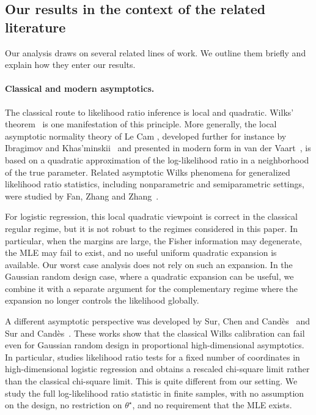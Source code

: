 \documentclass[11pt, letterpaper, hidelinks]{article}
\newcommand{\1}{\mathbf 1}
\theoremstyle{plain}
\theoremstyle{definition}
\newcommand{\thetastar}{\theta^\star}
\begin{document}
\subsection{Our results in the context of the related literature}

Our analysis draws on several related lines of work. We outline them briefly and
explain how they enter our results.

\paragraph{Classical and modern asymptotics.}

The classical route to likelihood ratio inference is local and quadratic.
Wilks' theorem~\cite{wilks1938large} is one manifestation of this principle.
More generally, the local asymptotic normality theory of Le Cam
\cite{LeCam1960LAN,LeCamYang2000}, developed further for instance by
Ibragimov and Khas'minskii~\cite{IbragimovKhasminskii1981} and presented in
modern form in van der Vaart~\cite{vdV1998asymptotic}, is based on a quadratic
approximation of the log-likelihood ratio in a neighborhood of the true
parameter. Related asymptotic Wilks phenomena for generalized likelihood ratio
statistics, including nonparametric and semiparametric settings, were studied
by Fan, Zhang and Zhang~\cite{FanZhangZhang2001Wilks}.

For logistic regression, this local quadratic viewpoint is correct in the
classical regular regime, but it is not robust to the regimes considered in
this paper. In particular, when the margins are large, the Fisher information
may degenerate, the MLE may fail to exist, and no useful uniform quadratic
expansion is available. Our worst case analysis does not rely on such an
expansion. In the Gaussian random design case, where a quadratic expansion can
be useful, we combine it with a separate argument for the complementary regime
where the expansion no longer controls the likelihood globally.

A different asymptotic perspective was developed by Sur, Chen and
Candès~\cite{sur2019likelihood} and Sur and Candès~\cite{sur2019modern}.
These works show that the classical Wilks calibration can fail even for
Gaussian random design in proportional high-dimensional asymptotics. In
particular, \cite{sur2019likelihood} studies likelihood ratio tests for a fixed
number of coordinates in high-dimensional logistic regression and obtains a
rescaled chi-square limit rather than the classical chi-square limit. This is
quite different from our setting. We study the full log-likelihood ratio
statistic in finite samples, with no assumption on the design, no restriction
on \(\thetastar\), and no requirement that the MLE exists.
\end{document}
